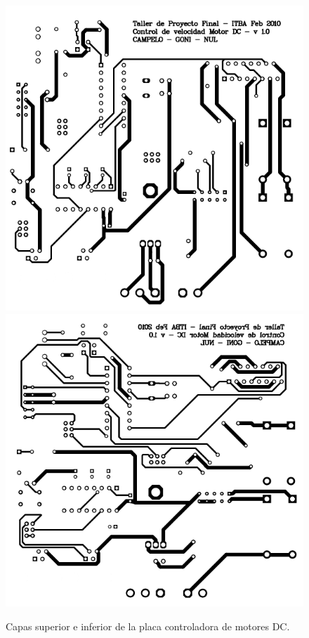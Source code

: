 \begin{figure}
\centering
	\includegraphics[scale=.3]{figuras/dc_top.png}
	\includegraphics[scale=.3]{figuras/dc_bottom.png}
	\caption{Capas superior e inferior de la placa controladora de motores DC.}
	\label{hF_placa_dc_capas}
\end{figure}

